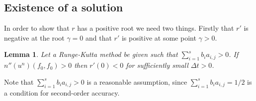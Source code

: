 \documentclass{article}
\newtheorem{lemma}[theorem]{Lemma}
\newcommand{\inner}[2]{\left< #1 , #2 \right>}
\begin{document}
%


\subsection{Existence of a solution}
In order to show that \(r\) has a positive root we need two things. Firstly that \(r'\) is negative at the root \(\gamma = 0\) and that \(r'\) is positive at some point \(\gamma > 0\).

    \begin{lemma}
        Let a Runge-Kutta method be given such that \(\sum_{i=1}^{s}b_{i}a_{i,j}>0\). If \(n''(u^n)(f_0,f_0) > 0\) then \(r'(0)<0\) for sufficiently small \(\Delta t > 0\).
    \end{lemma}

    \vspace*{5mm}
    Note that \(\sum_{i=1}^{s}b_{i}a_{i,j}>0\) is a reasonable assumption,
    since \(\sum_{i=1}^{s}b_{i}a_{i,j}=1/2\) is a condition for second-order accuracy.

\end{document}
